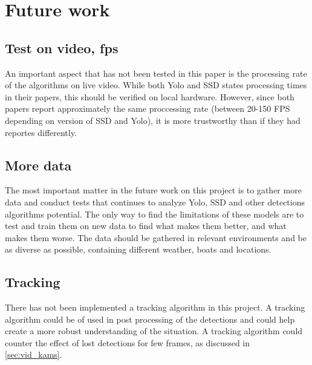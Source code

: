 \section{Future work}
\subsection{Test on video, fps}
An important aspect that has not been tested in this paper is the processing rate of the algorithms on live video. While both Yolo and SSD states processing times in their papers, this should be verified on local hardware. However, since both papers report approximately the same proccessing rate (between 20-150 FPS depending on version of SSD and Yolo), it is more trustworthy than if they had reportes differently.


\subsection{More data}
The most important matter in the future work on this project is to gather more data and conduct tests that continues to analyze Yolo, SSD and other detections algorithms potential. The only way to find the limitations of these models are to test and train them on new data to find what makes them better, and what makes them worse. The data should be gathered in relevant environments and be as diverse as possible, containing different weather, boats and locations.


\subsection{Tracking}
There has not been implemented a tracking algorithm in this project. A tracking algorithm could be of used in post processing of the detections and could help create a more robust understanding of the situation. A tracking algorithm could counter the effect of lost detections for few frames, as discussed in \ref{sec:vid_kams}.

